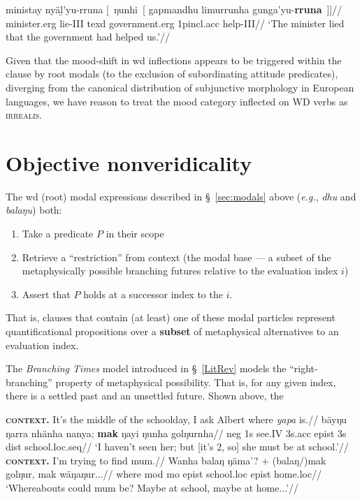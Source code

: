 \a\begingl\gla ministay nyäḻ'yu-rruna \textup[~ŋunhi~\textup[ gapmandhu limurrunha gunga'yu-\textbf{rruna}\textup{~]]}//
\glb minister.\gls{erg} lie-\gls{III} \gls{texd} government.\gls{erg} 1p\gls{incl}.\gls{acc} help-\gls{III}//
\glft`The minister lied that the government had helped us.'\trailingcitation{[DhG~20190417]}//\endgl
\xe



Given that the mood-shift in \gls{wd} inflections appears to be triggered within the clause by root modals (to the exclusion of subordinating attitude predicates), diverging from the canonical distribution of subjunctive morphology in European languages, we have reason \citep[following][]{Palmer2001} to treat the mood category inflected on WD verbs as \textsc{irrealis}.

\section{Objective nonveridicality}



The \gls{wd} (root) modal expressions described in \S~\ref{sec:modals} above (\textit{e.g.}, \textit{dhu} and \textit{balaŋu}) both:
\begin{enumerate}[\bf\sf i]
	\item  Take a predicate $ \mathit P $ in their scope 
	\item  Retrieve a ``restriction'' from context (the modal base --- a subset of the metaphysically possible branching futures relative to the evaluation index $ i $) 
	\item Assert that $ \mathit P $ holds at a successor index to the $ i $.

\end{enumerate} That is, clauses that contain (at least) one of these modal particles represent quantificational propositions over a \textbf{subset} of metaphysical alternatives to an evaluation index.

 The \textit{Branching Times} model introduced in \S~\ref{LitRev} models the ``right-branching'' property of metaphysical possibility. That is, for any given index, there is a settled past and an unsettled future. Shown above, the 

\pex\a\begingl\glpreamble\textbf{\textsc{context}.} It's the middle of the schoolday, I ask Albert where \textit{yapa} is.//
\gla bäyŋu ŋarra nhänha nanya; \textbf{mak} ŋayi ŋunha golŋurnha//
\glb \gls{neg} 1s see.\gls{IV} 3s.\gls{acc} \gls{epist} 3s \gls{dist} school.\gls{loc}.\gls{seq}//
\glft`I haven't seen her; but [it's 2, so] she must be at school.'\trailingcitation{[AW~20190429]}//\endgl
\a\begingl\glpreamble\textbf{\textsc{context.}} I'm trying to find mum.//
\gla Wanha balaŋ ŋäma'? + (balaŋ/)mak golŋur, mak wäŋaŋur...//
\glb where \gls{mod} \gls{mo} \gls{epist} school.\gls{loc} \gls{epist} home.\gls{loc}//
\glft`Whereabouts could mum be? Maybe at school, maybe at home...'//\endgl
\xe





